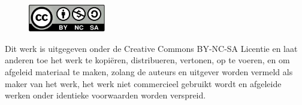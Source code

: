 \begin{figure}
\includegraphics[width=0.3\textwidth]{CC-BY-SA-NC.png}
\end{figure}

\bigskip

Dit werk is uitgegeven onder de Creative Commons BY-NC-SA Licentie en laat anderen toe het werk te kopi\"eren, distribueren, vertonen, op te voeren, en om afgeleid materiaal te maken, zolang de auteurs en uitgever worden vermeld als maker van het werk, het werk niet commercieel gebruikt wordt en afgeleide werken onder identieke voorwaarden worden verspreid.
